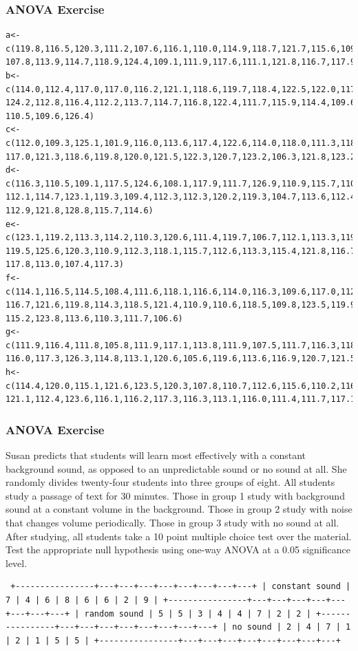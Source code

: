 \documentclass[xcolor=dvipsnames]{beamer} \usepackage{teachbeamer}
\begin{document}
\begin{frame}[fragile]
  \frametitle{ANOVA Exercise}
  \begin{scriptsize}
\begin{verbatim}
a<-c(119.8,116.5,120.3,111.2,107.6,116.1,110.0,114.9,118.7,121.7,115.6,109.4,
107.8,113.9,114.7,118.9,124.4,109.1,111.9,117.6,111.1,121.8,116.7,117.9,117.9)
b<-c(114.0,112.4,117.0,117.0,116.2,121.1,118.6,119.7,118.4,122.5,122.0,117.8,
124.2,112.8,116.4,112.2,113.7,114.7,116.8,122.4,111.7,115.9,114.4,109.6,123.2,
110.5,109.6,126.4)
c<-c(112.0,109.3,125.1,101.9,116.0,113.6,117.4,122.6,114.0,118.0,111.3,118.4,
117.0,121.3,118.6,119.8,120.0,121.5,122.3,120.7,123.2,106.3,121.8,123.2)
d<-c(116.3,110.5,109.1,117.5,124.6,108.1,117.9,111.7,126.9,110.9,115.7,110.8,
112.1,114.7,123.1,119.3,109.4,112.3,112.3,120.2,119.3,104.7,113.6,112.4,115.2,
112.9,121.8,128.8,115.7,114.6)
e<-c(123.1,119.2,113.3,114.2,110.3,120.6,111.4,119.7,106.7,112.1,113.3,119.3,
119.5,125.6,120.3,110.9,112.3,118.1,115.7,112.6,113.3,115.4,121.8,116.7,109.1,
117.8,113.0,107.4,117.3)
f<-c(114.1,116.5,114.5,108.4,111.6,118.1,116.6,114.0,116.3,109.6,117.0,112.0,
116.7,121.6,119.8,114.3,118.5,121.4,110.9,110.6,118.5,109.8,123.5,119.9,114.1,
115.2,123.8,113.6,110.3,111.7,106.6)
g<-c(111.9,116.4,111.8,105.8,111.9,117.1,113.8,111.9,107.5,111.7,116.3,118.4,
116.0,117.3,126.3,114.8,113.1,120.6,105.6,119.6,113.6,116.9,120.7,121.5,117.1,117.4)
h<-c(114.4,120.0,115.1,121.6,123.5,120.3,107.8,110.7,112.6,115.6,110.2,116.3,
121.1,112.4,123.6,116.1,116.2,117.3,116.3,113.1,116.0,111.4,111.7,117.1,116.2,113.9)
\end{verbatim}
  \end{scriptsize}
\end{frame}

\begin{frame}[fragile]
  \frametitle{ANOVA Exercise} Susan predicts that students will learn most effectively with a constant background sound, as opposed to an unpredictable sound or no sound at all. She randomly divides twenty-four students into three groups of eight. All students study a passage of text for 30 minutes. Those in group 1 study with background sound at a constant volume in the background. Those in group 2 study with noise that changes volume periodically. Those in group 3 study with no sound at all. After studying, all students take a 10 point multiple choice test over the material. Test the appropriate null hypothesis using one-way ANOVA at a 0.05 significance level.

\begin{footnotesize}
\begin{verbatim} +----------------+---+---+---+---+---+---+---+---+ | constant sound | 7 | 4 | 6 | 8 | 6 | 6 | 2 | 9 | +----------------+---+---+---+---+---+---+---+---+ | random sound | 5 | 5 | 3 | 4 | 4 | 7 | 2 | 2 | +----------------+---+---+---+---+---+---+---+---+ | no sound | 2 | 4 | 7 | 1 | 2 | 1 | 5 | 5 | +----------------+---+---+---+---+---+---+---+---+
\end{verbatim}
\end{footnotesize}
\end{frame}
\end{document}
